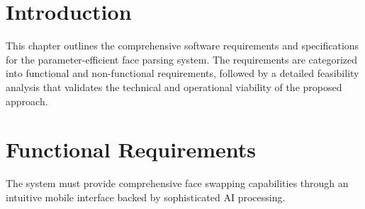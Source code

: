 \documentclass[12pt,a4paper]{report}
\begin{document}
\section{Introduction}

This chapter outlines the comprehensive software requirements and specifications for the parameter-efficient face parsing system. The requirements are categorized into functional and non-functional requirements, followed by a detailed feasibility analysis that validates the technical and operational viability of the proposed approach.

\section{Functional Requirements}

The system must provide comprehensive face swapping capabilities through an intuitive mobile interface backed by sophisticated AI processing.
\end{document}
